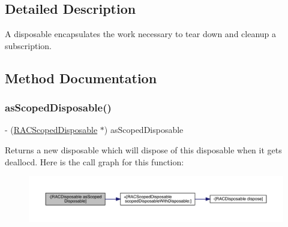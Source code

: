\subsection{Detailed Description}
A disposable encapsulates the work necessary to tear down and cleanup a subscription. 

\subsection{Method Documentation}
\mbox{\label{interface_r_a_c_disposable_a44a30ba7bac71901227b8a6eadaa23f5}} 
\subsubsection{\texorpdfstring{as\+Scoped\+Disposable()}{asScopedDisposable()}\hspace{0.1cm}{\footnotesize\ttfamily [1/3]}}
{\footnotesize\ttfamily -\/ (\mbox{\hyperlink{interface_r_a_c_scoped_disposable}{R\+A\+C\+Scoped\+Disposable}} $\ast$) as\+Scoped\+Disposable \begin{DoxyParamCaption}{ }\end{DoxyParamCaption}}

Returns a new disposable which will dispose of this disposable when it gets dealloc\textquotesingle{}d. Here is the call graph for this function\+:\nopagebreak
\begin{figure}[H]
\begin{center}
\leavevmode
\includegraphics[width=350pt]{interface_r_a_c_disposable_a44a30ba7bac71901227b8a6eadaa23f5_cgraph}
\end{center}
\end{figure}
\mbox{\label{interface_r_a_c_disposable_a44a30ba7bac71901227b8a6eadaa23f5}} 
